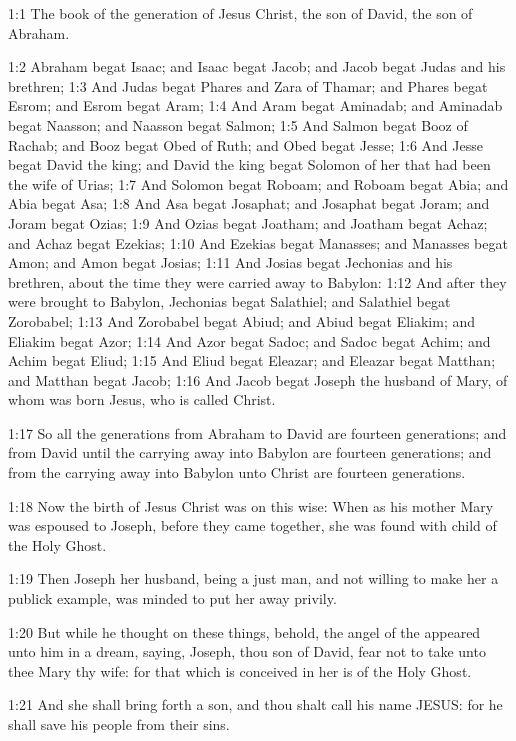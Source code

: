 

1:1 The book of the generation of Jesus Christ, the son of David, the son of Abraham.

1:2 Abraham begat Isaac; and Isaac begat Jacob; and Jacob begat Judas and his brethren; 1:3 And Judas begat Phares and Zara of Thamar; and Phares begat Esrom; and Esrom begat Aram; 1:4 And Aram begat Aminadab; and Aminadab begat Naasson; and Naasson begat Salmon; 1:5 And Salmon begat Booz of Rachab; and Booz begat Obed of Ruth; and Obed begat Jesse; 1:6 And Jesse begat David the king; and David the king begat Solomon of her that had been the wife of Urias; 1:7 And Solomon begat Roboam; and Roboam begat Abia; and Abia begat Asa; 1:8 And Asa begat Josaphat; and Josaphat begat Joram; and Joram begat Ozias; 1:9 And Ozias begat Joatham; and Joatham begat Achaz; and Achaz begat Ezekias; 1:10 And Ezekias begat Manasses; and Manasses begat Amon; and Amon begat Josias; 1:11 And Josias begat Jechonias and his brethren, about the time they were carried away to Babylon: 1:12 And after they were brought to Babylon, Jechonias begat Salathiel; and Salathiel begat Zorobabel; 1:13 And Zorobabel begat Abiud; and Abiud begat Eliakim; and Eliakim begat Azor; 1:14 And Azor begat Sadoc; and Sadoc begat Achim; and Achim begat Eliud; 1:15 And Eliud begat Eleazar; and Eleazar begat Matthan; and Matthan begat Jacob; 1:16 And Jacob begat Joseph the husband of Mary, of whom was born Jesus, who is called Christ.

1:17 So all the generations from Abraham to David are fourteen generations; and from David until the carrying away into Babylon are fourteen generations; and from the carrying away into Babylon unto Christ are fourteen generations.

1:18 Now the birth of Jesus Christ was on this wise: When as his mother Mary was espoused to Joseph, before they came together, she was found with child of the Holy Ghost.

1:19 Then Joseph her husband, being a just man, and not willing to make her a publick example, was minded to put her away privily.

1:20 But while he thought on these things, behold, the angel of the \LORD appeared unto him in a dream, saying, Joseph, thou son of David, fear not to take unto thee Mary thy wife: for that which is conceived in her is of the Holy Ghost.

1:21 And she shall bring forth a son, and thou shalt call his name JESUS: for he shall save his people from their sins.

